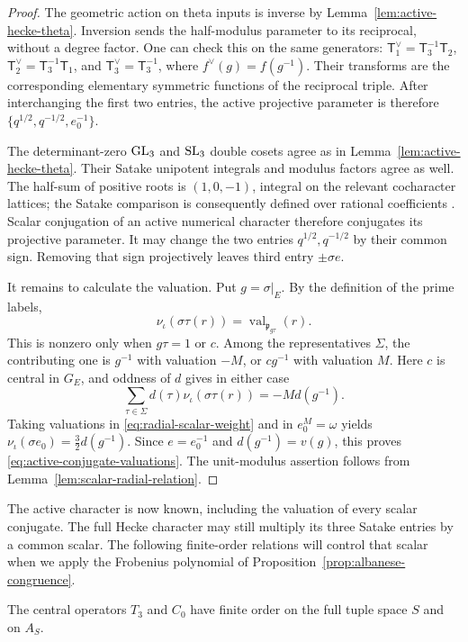 \begin{proof}
The geometric action on theta inputs is inverse by
Lemma~\ref{lem:active-hecke-theta}.  Inversion sends the
half-modulus parameter to its reciprocal, without a degree
factor.  One can check this on the same generators:
\(\mathsf T_1^\vee=\mathsf T_3^{-1}\mathsf T_2\),
\(\mathsf T_2^\vee=\mathsf T_3^{-1}\mathsf T_1\), and
\(\mathsf T_3^\vee=\mathsf T_3^{-1}\), where \(f^\vee(g)=f(g^{-1})\).
Their transforms are the corresponding elementary symmetric
functions of the reciprocal triple.  After interchanging the
first two entries, the active projective parameter is therefore
\(\{q^{1/2},q^{-1/2},e_0^{-1}\}\).

The determinant-zero \(\operatorname{GL}_3\) and \(\operatorname{SL}_3\) double cosets agree
as in Lemma~\ref{lem:active-hecke-theta}.  Their Satake unipotent
integrals and modulus factors agree as well.  The half-sum of
positive roots is \((1,0,-1)\), integral on the relevant
cocharacter lattices; the Satake comparison is consequently
defined over rational coefficients
\cite[Proposition~3.6]{Gross1998}.  Scalar conjugation of an
active numerical character therefore conjugates its projective
parameter.  It may change the two entries \(q^{1/2},q^{-1/2}\)
by their common sign.  Removing that sign projectively leaves
third entry \(\pm\sigma e\).

It remains to calculate the valuation.  Put \(g=\sigma|_E\).
By the definition of the prime labels,
\[
\nu_\iota(\sigma\tau(r))
 =\operatorname{val}_{\mathfrak p_{g\tau}}(r).
\]
This is nonzero only when \(g\tau=1\) or \(c\).  Among the
representatives \(\Sigma\), the contributing one is \(g^{-1}\)
with valuation \(-M\), or \(cg^{-1}\) with valuation \(M\).
Here \(c\) is central in \(G_E\), and oddness of \(d\) gives
in either case
\[
\sum_{\tau\in\Sigma}d(\tau)\nu_\iota(\sigma\tau(r))
   =-M d(g^{-1}).
\]
Taking valuations in \eqref{eq:radial-scalar-weight} and in
\(e_0^M=\omega\) yields
\(\nu_\iota(\sigma e_0)=\tfrac32d(g^{-1})\).
Since \(e=e_0^{-1}\) and \(d(g^{-1})=v(g)\), this proves
\eqref{eq:active-conjugate-valuations}.  The unit-modulus
assertion follows from Lemma~\ref{lem:scalar-radial-relation}.
\end{proof}

The active character is now known, including the valuation of every
scalar conjugate.  The full Hecke character may still multiply its
three Satake entries by a common scalar.  The following finite-order
relations will control that scalar when we apply the Frobenius
polynomial of Proposition~\ref{prop:albanese-congruence}.

\begin{lemma}\label{lem:central-finite-order}
The central operators \(T_3\) and \(C_0\) have finite order on
the full tuple space \(S\) and on \(A_S\).
\end{lemma}

